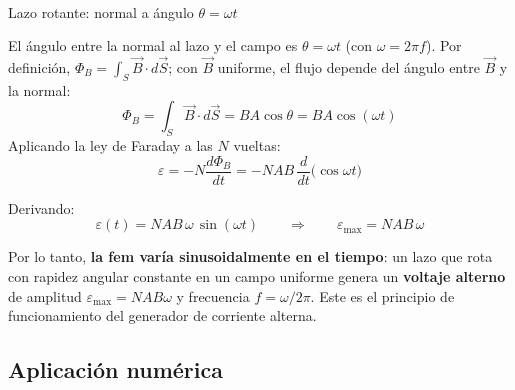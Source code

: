 \documentclass[12pt,letterpaper]{article}
\newcommand{\eps}{\varepsilon}
\begin{document}
\noindent
\begin{minipage}[t]{0.42\textwidth}
\centering\vspace{0pt}
\\[2pt]
{\footnotesize Lazo rotante: normal a \'angulo $\theta=\omega t$}
\end{minipage}%
\hfill
\begin{minipage}[t]{0.55\textwidth}
\vspace{0pt}
El \'angulo entre la normal al lazo y el campo es $\theta=\omega t$ (con $\omega=2\pi f$). Por
definici\'on, $\Phi_B = \int_S \vec{B}\cdot d\vec{S}$; con $\vec{B}$ uniforme, el flujo depende del
\'angulo entre $\vec{B}$ y la normal:
\[
    \Phi_B = \int_S \vec{B}\cdot d\vec{S} = B A\cos\theta = B A\cos(\omega t)
\]
Aplicando la ley de Faraday a las $N$ vueltas:
\[
    \eps = -N\frac{d\Phi_B}{dt}
         = -N A B\,\frac{d}{dt}\!\big(\cos\omega t\big)
\]
\end{minipage}

\medskip

\noindent Derivando:
\[
    \boxed{\eps(t) = N A B\,\omega\,\sin(\omega t)}
    \qquad\Longrightarrow\qquad
    \eps_{\max} = N A B\,\omega
\]

\noindent Por lo tanto, \textbf{la fem var\'ia sinusoidalmente en el tiempo}: un lazo que rota con
rapidez angular constante en un campo uniforme genera un \textbf{voltaje alterno} de amplitud
$\eps_{\max}=NAB\omega$ y frecuencia $f=\omega/2\pi$. Este es el principio de funcionamiento del
generador de corriente alterna.

\subsection*{Aplicaci\'on num\'erica}
\end{document}

